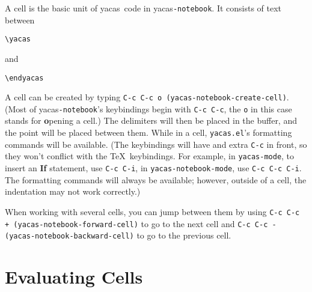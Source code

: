 \documentclass[12pt]{article}
\def\ys{\textsf{yacas}}
\def\yn{\textsf{yacas}\texttt{-notebook}}
\begin{document}
A cell is the basic unit of \ys\ code in \yn.  It consists of
text between
\begin{verbatim}
\yacas
\end{verbatim}
and
\begin{verbatim}
\endyacas
\end{verbatim}
A cell can be created by typing \texttt{C-c C-c o
  (yacas-notebook-create-cell)}.  (Most of \yn's keybindings begin with
\texttt{C-c C-c}, the \texttt{o} in this case stands for
\textbf{o}pening a cell.)  The delimiters will then be placed in the
buffer, and the point will be placed between them.  While in a cell,
\texttt{yacas.el}'s formatting commands will be available. (The
keybindings will have and extra \texttt{C-c} in front, so they won't
conflict with the \TeX\ keybindings.  For example, in
\texttt{yacas-mode}, to insert an \textbf{If} statement, use
\texttt{C-c C-i}, in \texttt{yacas-notebook-mode}, use \texttt{C-c C-c
C-i}. The formatting commands will always be available; however,
outside of a cell, the indentation may not work correctly.)

When working with several cells, you can jump between them by using
\texttt{C-c C-c + (yacas-notebook-forward-cell)} to go to the next cell and
\texttt{C-c C-c - (yacas-notebook-backward-cell)} to go to the previous cell.

\section{Evaluating Cells}
\end{document}
